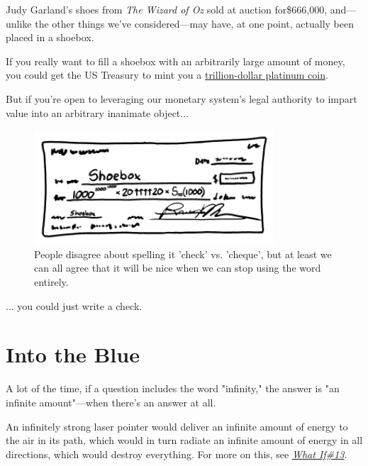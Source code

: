 {{Judy Garland's shoes from \emph{The Wizard of Oz} sold at auction for\$666,000, and—unlike the other things we've considered—may have, at one point, actually been placed in a shoebox.}

{If you really want to fill a shoebox with an arbitrarily large amount of money, you could get the US Treasury to mint you a \href{https://en.wikipedia.org/wiki/Trillion\_dollar\_coin\#Legal\_basis}{trillion-dollar platinum coin}.}

{But if you're open to leveraging our monetary system's legal authority to impart value into an arbitrary inanimate object...}

\begin{figure}[!htbp]
\centering
\includegraphics[scale=0.5, max width=0.8\textwidth]{imgs/a/108/check.png}
\caption{People disagree about spelling it 'check' vs. 'cheque', but at least we can all agree that it will be nice when we can stop using the word entirely.}
\end{figure}

{... you could just write a check.}

{
\chapter{Into the Blue}
}

\hfill{}

{A lot of the time, if a question includes the word "infinity," the answer is "an infinite amount"—when there's an answer at all.}

{An infinitely strong laser pointer would deliver an infinite amount of energy to the air in its path, which would in turn radiate an infinite amount of energy in all directions, which would destroy everything. For more on this, see \emph{ \href{http://what-if.xkcd.com/13/}{What If\#13}}.}

}
